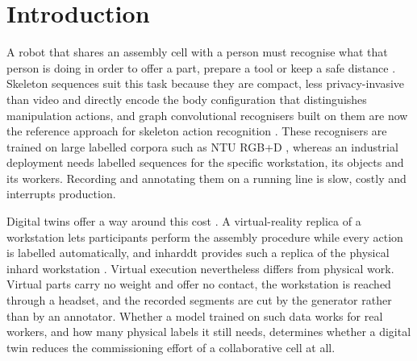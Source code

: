 \documentclass[]{interact}
\begin{document}
\acresetall

\section{Introduction}
\label{sec:introduction}

A robot that shares an assembly cell with a person must recognise what that
person is doing in order to offer a part, prepare a tool or keep a safe
distance \citep{wang2018hrcmotion}. Skeleton sequences suit this task because
they are compact, less privacy-invasive than video and directly encode the body
configuration that distinguishes manipulation actions, and graph convolutional
recognisers built on them are now the reference approach for skeleton action
recognition \citep{yan2018stgcn,chen2021ctrgcn,liu2025skeletonreview}. These
recognisers are trained on large labelled corpora such as NTU
RGB+D \citep{shahroudy2016ntu,liu2020ntu120}, whereas an industrial deployment
needs labelled sequences for the specific workstation, its objects and its
workers. Recording and annotating them on a running line is slow, costly and
interrupts production.

Digital twins offer a way around this cost \citep{tao2019digitaltwin}. A
virtual-reality replica of a workstation lets participants perform the assembly
procedure while every action is labelled automatically, and
\ac{inharddt} \citep{dallel2023digital} provides such a replica of the physical
\ac{inhard} workstation \citep{dallel2020inhardpaper}. Virtual execution
nevertheless differs from physical work. Virtual parts carry no weight and
offer no contact, the workstation is reached through a headset, and the
recorded segments are cut by the generator rather than by an annotator. Whether
a model trained on such data works for real workers, and how many physical
labels it still needs, determines whether a digital twin reduces the
commissioning effort of a collaborative cell at all.
\end{document}
